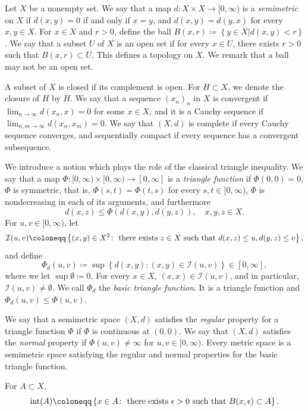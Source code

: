 \documentclass[a4paper, reqno, 11pt]{amsart}
\theoremstyle{definition}
\begin{document}
Let $X$ be a nonempty set. 
We say that a map $d : X \times X \to [0, \infty)$ is a {\it semimetric} on $X$ if $d(x,y) = 0$ if and only if $x=y$, and $d(x,y) = d(y,x)$ for every $x, y \in X$.  
For $x \in X$ and $r > 0$, define the ball $B(x,r) \coloneqq \left\{y \in X | d(x,y) < r \right\}$. 
We say that a subset $U$ of $X$ is an open set if 
for every $x \in U$, there exists $r > 0$ such that $B(x,r) \subset U$. 
This defines a topology on $X$. 
We remark that a ball may not be an open set.  

A subset of $X$ is closed if its complement is open. 
For $H \subset X$, we denote the closure of $H$ by $\overline{H}$. 
We say that a sequence $(x_n)_n$ in $X$ is convergent if  $\lim_{n \to \infty} d(x_n, x) = 0$ for some $x \in X$, and it is a Cauchy sequence if $\lim_{n, m \to \infty} d(x_n, x_m) = 0$. 
We say that $(X,d)$ is complete if every Cauchy sequence converges, and sequentially compact if every sequence has a convergent subsequence.   


We introduce a notion which plays the role of the classical triangle inequality. 
We say that a map $\Phi \colon [0,\infty) \times [0,\infty) \to [0,\infty]$ is a {\it triangle function} if $\Phi(0,0) = 0$, $\Phi$ is symmetric, that is, $\Phi(s,t) = \Phi(t,s)$ for every $s, t \in [0,\infty)$, $\Phi$ is nondecreasing  in each of its arguments, and furthermore 
\[ d(x,z) \le \Phi(d(x,y), d(y,z)), \quad x, y, z \in X.  \]
For $u, v \in [0,\infty)$, let 
\[ \mathcal{I}(u,v) \coloneqq \left\{(x,y) \in X^2 \colon  \textup{ there exists }   z \in X \textup{ such that } d(x,z) \le u, d(y,z) \le v\right\}, \]
and define  
\[ \Phi_d (u,v) \coloneqq \sup\left\{d(x,y) \colon (x,y) \in \mathcal{I}(u,v) \right\} \in [0,\infty], \]
where we let $\sup \emptyset \coloneqq 0$. 
For every $x \in X$, $(x,x) \in \mathcal{I}(u,v)$, and in particular, $\mathcal{I}(u,v) \ne \emptyset$. 
We call $\Phi_d$ the {\it basic triangle function}. 
It is a triangle function and $\Phi_d (u,v) \le \Phi(u,v)$. 

We say that a semimetric space $(X,d)$ satisfies the {\it regular} property for a triangle function $\Phi$ if $\Phi$ is continuous at $(0,0)$. 
We say that $(X,d)$ satisfies the  {\it normal} property if $\Phi (u,v) \ne \infty$ for $u, v \in [0,\infty)$. 
Every metric space is a semimetric space satisfying the regular and normal properties for the basic triangle function. 

For $A \subset X$, 
\[ \textup{int}(A) \coloneqq \left\{x \in A \colon \textup{ there exists $\epsilon > 0$ such that $B(x,\epsilon) \subset A$} \right\}. \]
\end{document}
